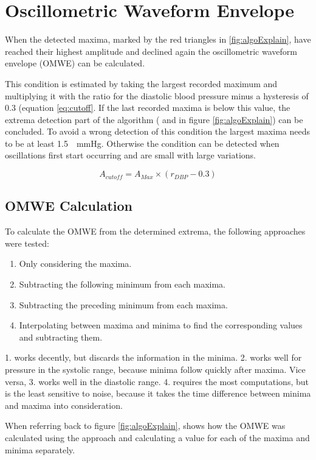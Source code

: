 \section{Oscillometric Waveform Envelope}
When the detected maxima, marked by the red triangles in \ref{fig:algoExplain}, have reached their highest amplitude and declined again the oscillometric waveform envelope (OMWE) can be calculated. 

This condition is estimated by taking the largest recorded maximum and multiplying it with the ratio for the diastolic blood pressure minus a hysteresis of $0.3$ (equation \ref{eq:cutoff}. If the last recorded maxima is below this value, the extrema detection part of the algorithm ( and  in figure \ref{fig:algoExplain}) can be concluded. To avoid a wrong detection of this condition the largest maxima needs to be at least \SI{1.5}{\delta\mmHg}. Otherwise the condition can be detected when oscillations first start occurring and are small with large variations. 

\begin{equation}
\label{eq:cutoff}
A_{cutoff}=A_{Max}\times (r_{DBP} - 0.3)
\end{equation}

\subsection{OMWE Calculation}
To calculate the OMWE from the determined extrema, the following approaches were tested:

\begin{enumerate}[noitemsep]
\item Only considering the maxima.
\item Subtracting the following minimum from each maxima.
\item Subtracting the preceding minimum from each maxima.
\item Interpolating between maxima and minima to find the corresponding values and subtracting them. 
\end{enumerate}

1. works decently, but discards the information in the minima. 2. works well for pressure in the systolic range, because minima follow quickly after maxima. Vice versa, 3. works well in the diastolic range. 4. requires the most computations, but is the least sensitive to noise, because it takes the time difference between minima and maxima into consideration. 

When referring back to figure \ref{fig:algoExplain},  shows how the OMWE was calculated using the approach and calculating a value for each of the maxima and minima separately. 


